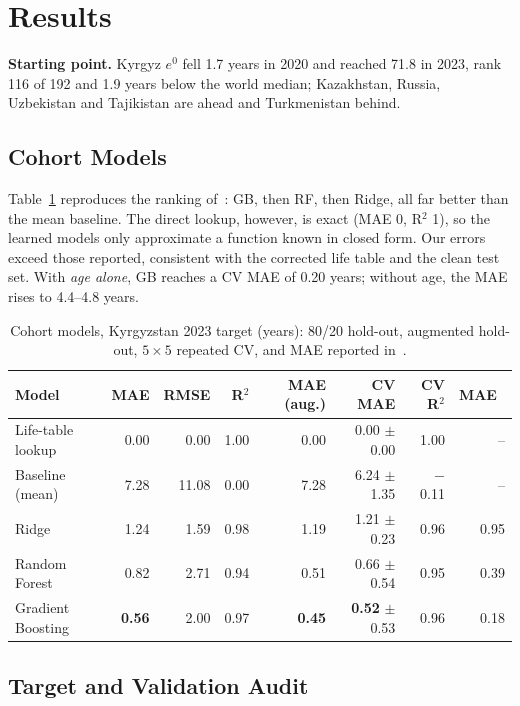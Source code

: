 \documentclass[runningheads]{llncs}
\begin{document}
\section{Results}

\textbf{Starting point.} Kyrgyz $e^0$ fell 1.7 years in 2020 and reached 71.8 in 2023, rank 116
of 192 and 1.9 years below the world median; Kazakhstan, Russia, Uzbekistan and Tajikistan are
ahead and Turkmenistan behind.

\subsection{Cohort Models}

Table~\ref{tab:models} reproduces the ranking of~\cite{bopushova2026}: GB, then RF, then Ridge,
all far better than the mean baseline. The direct lookup, however, is exact (MAE 0, R$^2$ 1), so the
learned models only approximate a function known in closed form. Our errors exceed those reported,
consistent with the corrected life table and the clean test set. With \emph{age alone}, GB reaches
a CV MAE of 0.20 years; without age, the MAE rises to 4.4--4.8 years.

\begin{table}[t]
\centering
\caption{Cohort models, Kyrgyzstan 2023 target (years): 80/20 hold-out, augmented hold-out,
$5\times5$ repeated CV, and MAE reported in~\cite{bopushova2026}.}\label{tab:models}
\scriptsize
\begin{tabular}{@{}lrrrrrrr@{}}
\toprule
Model & MAE & RMSE & R$^2$ & MAE (aug.) & CV MAE & CV R$^2$ & MAE~\cite{bopushova2026} \\
\midrule
Life-table lookup & 0.00 & 0.00 & 1.00 & 0.00 & 0.00 $\pm$ 0.00 & 1.00 & -- \\
Baseline (mean) & 7.28 & 11.08 & 0.00 & 7.28 & 6.24 $\pm$ 1.35 & $-$0.11 & -- \\
Ridge & 1.24 & 1.59 & 0.98 & 1.19 & 1.21 $\pm$ 0.23 & 0.96 & 0.95 \\
Random Forest & 0.82 & 2.71 & 0.94 & 0.51 & 0.66 $\pm$ 0.54 & 0.95 & 0.39 \\
Gradient Boosting & \textbf{0.56} & 2.00 & 0.97 & \textbf{0.45} & \textbf{0.52} $\pm$ 0.53 & 0.96 & 0.18 \\
\bottomrule
\end{tabular}
\end{table}

\subsection{Target and Validation Audit}\label{sec:leak}
\end{document}

